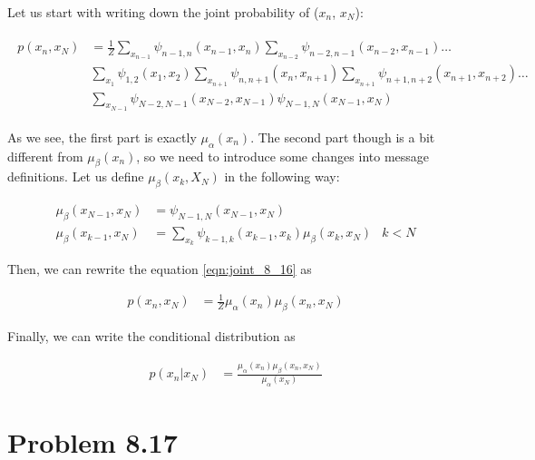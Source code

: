 \documentclass[fleqn]{article}
\begin{document}
Let us start with writing down the joint probability of ($x_n$, $x_N$):

\begin{align}
		\label{eqn:joint_8_16}
	\begin{split}
p(x_n, x_N) &= \frac{1}{Z}\sum\limits_{x_{n-1}}\psi_{n-1,n}(x_{n-1},x_n)\sum\limits_{x_{n-2}}\psi_{n-2,n-1}(x_{n-2},x_{n-1})\ldots\\&\sum\limits_{x_{1}}\psi_{1,2}(x_{1},x_2)\sum\limits_{x_{n+1}}\psi_{n,n+1}(x_{n},x_{n+1})\sum\limits_{x_{n+1}}\psi_{n+1,n+2}(x_{n+1},x_{n+2})\ldots\\&\sum\limits_{x_{N-1}}\psi_{N-2,N-1}(x_{N-2},x_{N-1})\psi_{N-1,N}(x_{N-1},x_N)
	\end{split}
\end{align}

As we see, the first part is exactly $\mu_\alpha(x_n)$. The second part though is a bit different from $\mu_\beta(x_n)$, so we need to introduce some changes into message definitions. Let us define $\mu_\beta(x_k, X_N)$ in the following way:

\begin{align}
	\mu_\beta(x_{N-1}, x_N) & = \psi_{N-1,N}(x_{N-1}, x_N)  & \\
	\mu_\beta(x_{k-1}, x_N) & = \sum\limits_{x_k}\psi_{k-1,k}(x_{k-1}, x_k)\mu_\beta(x_{k}, x_N) & k < N
\end{align}

Then, we can rewrite the equation \ref{eqn:joint_8_16} as 

\begin{align}
	p(x_n, x_N) &= \frac{1}{Z}\mu_\alpha(x_n)\mu_\beta(x_{n}, x_N) 
\end{align}

Finally, we can write the conditional distribution as 

\begin{align}
p(x_n | x_N) &= \frac{\mu_\alpha(x_n)\mu_\beta(x_{n}, x_N)}{\mu_\alpha(x_N)}
\end{align}

\section*{Problem 8.17}

\end{document}
